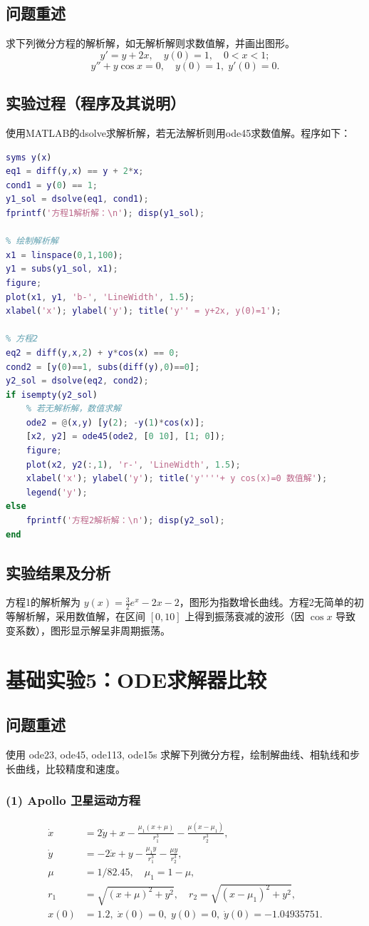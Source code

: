 \documentclass[12pt,a4paper]{article}
\begin{document}
\subsection*{问题重述}
求下列微分方程的解析解，如无解析解则求数值解，并画出图形。
\[
y' = y + 2x,\quad y(0)=1,\quad 0<x<1;
\]
\[
y'' + y\cos x = 0,\quad y(0)=1,\; y'(0)=0.
\]

\subsection*{实验过程（程序及其说明）}
使用MATLAB的dsolve求解析解，若无法解析则用ode45求数值解。程序如下：
\begin{lstlisting}[language=Matlab, caption={实验2代码}]
% 方程1
syms y(x)
eq1 = diff(y,x) == y + 2*x;
cond1 = y(0) == 1;
y1_sol = dsolve(eq1, cond1);
fprintf('方程1解析解：\n'); disp(y1_sol);

% 绘制解析解
x1 = linspace(0,1,100);
y1 = subs(y1_sol, x1);
figure;
plot(x1, y1, 'b-', 'LineWidth', 1.5);
xlabel('x'); ylabel('y'); title('y'' = y+2x, y(0)=1');

% 方程2
eq2 = diff(y,x,2) + y*cos(x) == 0;
cond2 = [y(0)==1, subs(diff(y),0)==0];
y2_sol = dsolve(eq2, cond2);
if isempty(y2_sol)
    % 若无解析解，数值求解
    ode2 = @(x,y) [y(2); -y(1)*cos(x)];
    [x2, y2] = ode45(ode2, [0 10], [1; 0]);
    figure;
    plot(x2, y2(:,1), 'r-', 'LineWidth', 1.5);
    xlabel('x'); ylabel('y'); title('y''''+ y cos(x)=0 数值解');
    legend('y');
else
    fprintf('方程2解析解：\n'); disp(y2_sol);
end
\end{lstlisting}

\subsection*{实验结果及分析}
方程1的解析解为 \(y(x) = \frac{3}{2}e^{x} - 2x - 2\)，图形为指数增长曲线。方程2无简单的初等解析解，采用数值解，在区间 \([0,10]\) 上得到振荡衰减的波形（因 \(\cos x\) 导致变系数），图形显示解呈非周期振荡。

\section*{基础实验5：ODE求解器比较}
\subsection*{问题重述}
使用 ode23, ode45, ode113, ode15s 求解下列微分方程，绘制解曲线、相轨线和步长曲线，比较精度和速度。
\subsubsection*{(1) Apollo 卫星运动方程}
\begin{align*}
\dot{x} &= 2\dot{y} + x - \frac{\mu_{1}(x+\mu)}{r_{1}^{3}} - \frac{\mu(x-\mu_{1})}{r_{2}^{3}},\\
\dot{y} &= -2\dot{x} + y - \frac{\mu_{1}y}{r_{1}^{3}} - \frac{\mu y}{r_{2}^{3}},\\
\mu &= 1/82.45,\quad \mu_{1}=1-\mu,\\
r_{1}&=\sqrt{(x+\mu)^2+y^2},\quad r_{2}=\sqrt{(x-\mu_{1})^2+y^2},\\
x(0)&=1.2,\;\dot{x}(0)=0,\;y(0)=0,\;\dot{y}(0)=-1.04935751.
\end{align*}
\end{document}
